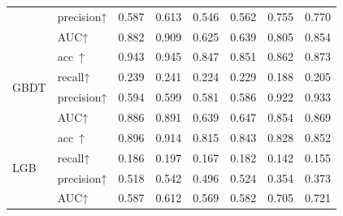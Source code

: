 \begin{table}[h]
{\begin{tabular}{llllllll}
				& precision↑               & 0.587 & 0.613                          & 0.546 & 0.562                                                                                    & 0.755 & 0.770                         \\
				& AUC↑                     & 0.882 & 0.909                          & 0.625 & 0.639                                                                                    & 0.805 & 0.854                         \\
				\multirow{4}{*}{GBDT}           & acc~↑                    & 0.943 & 0.945                          & 0.847 & 0.851                                                                                    & 0.862 & 0.873                         \\
				& recall↑                  & 0.239 & 0.241                          & 0.224 & 0.229                                                                                    & 0.188 & 0.205                         \\
				& precision↑               & 0.594 & 0.599                          & 0.581 & 0.586                                                                                    & 0.922 & 0.933                         \\
				& AUC↑                     & 0.886 & 0.891                          & 0.639 & 0.647                                                                                    & 0.854 & 0.869                         \\
				\multirow{4}{*}{LGB}            & acc~↑                    & 0.896 & 0.914                          & 0.815 & 0.843                                                                                    & 0.828 & 0.852                         \\
				& recall↑                  & 0.186 & 0.197                          & 0.167 & 0.182                                                                                    & 0.142 & 0.155                         \\
				& precision↑               & 0.518 & 0.542                          & 0.496 & 0.524                                                                                    & 0.354 & 0.373                         \\
				& AUC↑                     & 0.587 & 0.612                          & 0.569 & 0.582                                                                                    & 0.705 & 0.721                         \\
				\bottomrule[1.5pt]
			\end{tabular}
		}
\end{table}
\vspace{-0.35cm}

